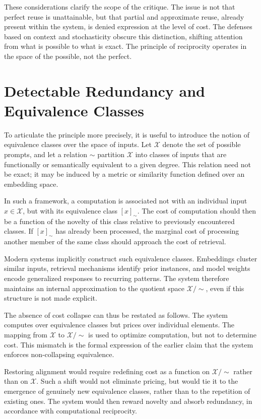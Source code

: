 \documentclass[12pt, oneside]{article}
\begin{document}
These considerations clarify the scope of the critique. The issue is not that perfect reuse is unattainable, but that partial and approximate reuse, already present within the system, is denied expression at the level of cost. The defenses based on context and stochasticity obscure this distinction, shifting attention from what is possible to what is exact. The principle of reciprocity operates in the space of the possible, not the perfect.

\section{Detectable Redundancy and Equivalence Classes}

To articulate the principle more precisely, it is useful to introduce the notion of equivalence classes over the space of inputs. Let $\mathcal{X}$ denote the set of possible prompts, and let a relation $\sim$ partition $\mathcal{X}$ into classes of inputs that are functionally or semantically equivalent to a given degree. This relation need not be exact; it may be induced by a metric or similarity function defined over an embedding space.

In such a framework, a computation is associated not with an individual input $x \in \mathcal{X}$, but with its equivalence class $[x]_{\sim}$. The cost of computation should then be a function of the novelty of this class relative to previously encountered classes. If $[x]_{\sim}$ has already been processed, the marginal cost of processing another member of the same class should approach the cost of retrieval.

Modern systems implicitly construct such equivalence classes. Embeddings cluster similar inputs, retrieval mechanisms identify prior instances, and model weights encode generalized responses to recurring patterns. The system therefore maintains an internal approximation to the quotient space $\mathcal{X} / {\sim}$, even if this structure is not made explicit.

The absence of cost collapse can thus be restated as follows. The system computes over equivalence classes but prices over individual elements. The mapping from $\mathcal{X}$ to $\mathcal{X} / {\sim}$ is used to optimize computation, but not to determine cost. This mismatch is the formal expression of the earlier claim that the system enforces non-collapsing equivalence.

Restoring alignment would require redefining cost as a function on $\mathcal{X} / {\sim}$ rather than on $\mathcal{X}$. Such a shift would not eliminate pricing, but would tie it to the emergence of genuinely new equivalence classes, rather than to the repetition of existing ones. The system would then reward novelty and absorb redundancy, in accordance with computational reciprocity.
\end{document}
